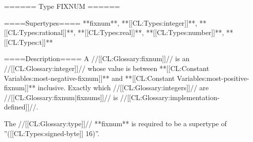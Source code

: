 ====== Type FIXNUM ======

====Supertypes====
**fixnum**, **[[CL:Types:integer]]**, **[[CL:Types:rational]]**, **[[CL:Types:real]]**, **[[CL:Types:number]]**, **[[CL:Types:t]]**

====Description====
A //[[CL:Glossary:fixnum]]// is an //[[CL:Glossary:integer]]// whose value is between **[[CL:Constant Variables:most-negative-fixnum]]** and **[[CL:Constant Variables:most-positive-fixnum]]** inclusive. Exactly which //[[CL:Glossary:integers]]// are //[[CL:Glossary:fixnum|fixnums]]// is //[[CL:Glossary:implementation-defined]]//.

The //[[CL:Glossary:type]]// **fixnum** is required to be a supertype of ''([[CL:Types:signed-byte]] 16)''.

 
